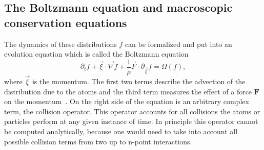 \subsection{The Boltzmann equation and macroscopic conservation equations}
The dynamics of these distributions $f$ can be formalized and put into an evolution equation which is called the Boltzmann equation
\begin{equation}\label{eq:boltzmann_eq}
    \partial_t f + \vec{\xi}\cdot\vec{\nabla} f + \frac{1}{\rho}\vec{F}\cdot\partial_{\vec{\xi}}f = \Omega(f), 
\end{equation}
where $\vec{\xi}$ is the momentum. 
The first two terms describe the advection of the distribution due to the atoms and the third term measures the effect of a force $\mathbf{F}$ on the momentum~\cite{krugerLatticeBoltzmannMethod2017}.
On the right side of the equation is an arbitrary complex term, the collision operator.
This operator accounts for all collisions the atoms or particles perform at any given instance of time.
In principle this operator cannot be computed analytically, because one would need to take into account all possible collision terms from two up to n-point interactions.

